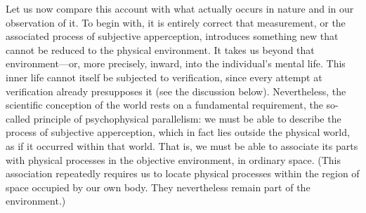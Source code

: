 \documentclass[fontsize=13pt,twoside,openany,headings=normal,parskip=false,bookmarkpackage=false,DIV=calc]{scrbook}
\begin{document}
Let us now compare this account with what actually occurs in nature and in our observation of it. To begin with, it is entirely correct that measurement, or the associated process of subjective apperception, introduces something new that cannot be reduced to the physical environment. It takes us beyond that environment---or, more precisely, inward, into the individual's mental life. This inner life cannot itself be subjected to verification, since every attempt at verification already presupposes it (see the discussion below). Nevertheless, the scientific conception of the world rests on a fundamental requirement, the so-called principle of psychophysical parallelism: we must be able to describe the process of subjective apperception, which in fact lies outside the physical world, as if it occurred within that world. That is, we must be able to associate its parts with physical processes in the objective environment, in ordinary space. (This association repeatedly requires us to locate physical processes within the region of space occupied by our own body. They nevertheless remain part of the environment.)
\end{document}
